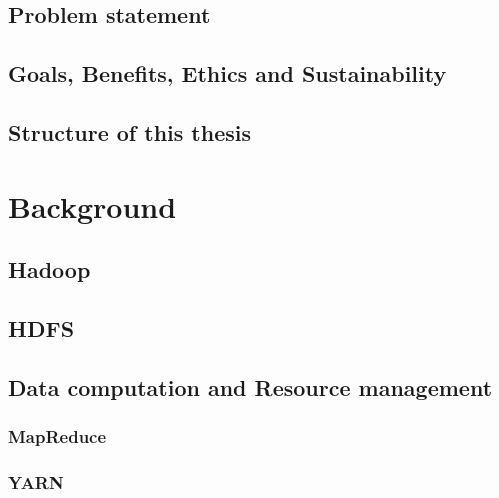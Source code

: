 \documentclass[12pt,a4paper,twoside,openright]{book}
\begin{document}
\section{Problem statement}
\label{sec:problem_statement}


\section{Goals, Benefits, Ethics and Sustainability}
\label{sec:goals_ethics}


\section{Structure of this thesis}
\label{sec:thesis_structure}


\chapter{Background}
\label{chap:background}


\section{Hadoop}
\label{sec:hadoop}


\section{HDFS}
\label{sec:hdfs}


\section{Data computation and Resource management}
\label{sec:resource_mgm}


\subsection{MapReduce}
\label{ssec:mapreduce}


\subsection{YARN}
\label{ssec:yarn}

\end{document}
